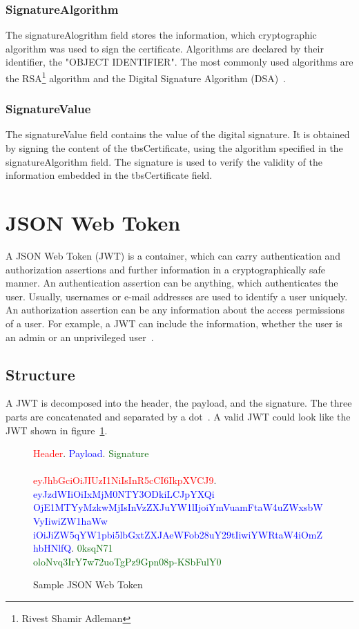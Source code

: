 \subsubsection{SignatureAlgorithm}
The signatureAlogrithm field stores the information, which cryptographic algorithm was used to sign the certificate.
Algorithms are declared by their identifier, the "OBJECT IDENTIFIER".
The most commonly used algorithms are the RSA\footnote{Rivest Shamir Adleman} algorithm and the Digital Signature Algorithm (DSA)~\cite{x509rfc}.

\subsubsection{SignatureValue}
The signatureValue field contains the value of the digital signature.
It is obtained by signing the content of the tbsCertificate, using the algorithm specified in the signatureAlgorithm field.
The signature is used to verify the validity of the information embedded in the tbsCertificate field.

\section{JSON Web Token}
A JSON Web Token (JWT) is a container, which can carry authentication and authorization assertions and further information in a cryptographically safe manner.
An authentication assertion can be anything, which authenticates the user.
Usually, usernames or e-mail addresses are used to identify a user uniquely.
An authorization assertion can be any information about the access permissions of a user.
For example, a JWT can include the information, whether the user is an admin or an unprivileged user~\cite{dias2020microservices}. 

\subsection{Structure}
A JWT is decomposed into the header, the payload, and the signature.
The three parts are concatenated and separated by a dot~\cite{jwtdocauth0}.
A valid JWT could look like the JWT shown in figure~\ref{fig:myjwt}.
\begin{figure}[H]
    \textcolor{red}{Header}.
	\textcolor{blue}{Payload}.
	\textcolor{darkgreen}{Signature} \\ \\
    \textcolor{red}{eyJhbGciOiJIUzI1NiIsInR5cCI6IkpXVCJ9}.
	\textcolor{blue}{eyJzdWIiOiIxMjM0NTY3ODkiLCJpYXQi\\OjE1MTYyMzkwMjIsInVzZXJuYW1lIjoiYmVuamFtaW4uZWxsbWVyIiwiZW1haWw\\iOiJiZW5qYW1pbi5lbGxtZXJAeWFob28uY29tIiwiYWRtaW4iOmZhbHNlfQ}.
	\textcolor{darkgreen}{0ksqN71\\oloNvq3IrY7w72uoTgPz9Gpn08p-KSbFulY0}
    \caption{Sample JSON Web Token}
    \label{fig:myjwt}
\end{figure}

